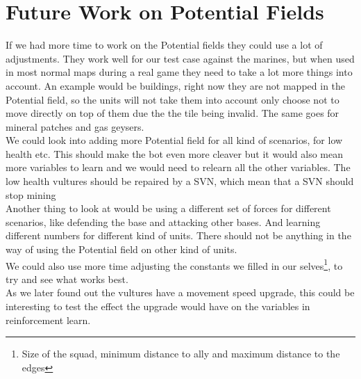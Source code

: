 \section{Future Work on Potential Fields}
	If we had more time to work on the Potential fields they could use a lot of adjustments. They work well for our test case against the marines, but when used in most normal maps during a real game they need to take a lot more things into account. An example would be buildings, right now they are not mapped in the Potential field, so the units will not take them into account only choose not to move directly on top of them due the the tile being invalid. The same goes for mineral patches and gas geysers. \\
	
	We could look into adding more Potential field for all kind of scenarios, for low health etc. This should make the bot even more cleaver but it would also mean more variables to learn and we would need to relearn all the other variables. The low health vultures should be repaired by a SVN, which mean that
a SVN should stop mining\\
	
	Another thing to look at would be using a different set of forces for different scenarios, like defending the base and attacking other bases. And learning different numbers for different kind of units. There should not be anything in the way of using the Potential field on other kind of units. \\
	
	We could also use more time adjusting the constants we filled in our selves\footnote{Size of the squad, minimum distance to ally and maximum distance to the edges}, to try and see what works best. \\

	As we later found out the vultures have a movement speed upgrade, this could be interesting to test the effect the upgrade would have on the
variables in reinforcement learn.	